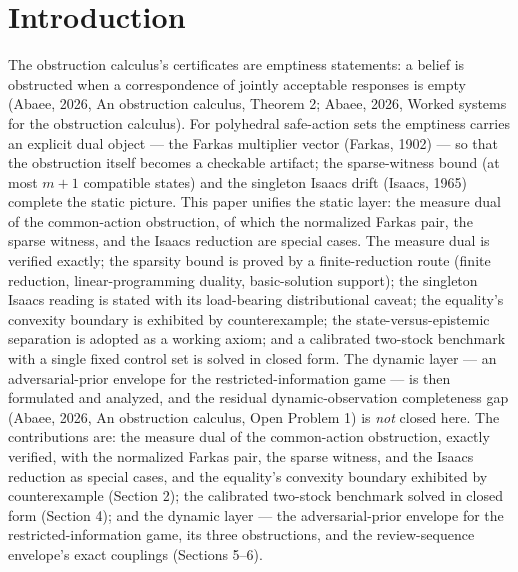 \documentclass[10pt,twocolumn]{article}
\theoremstyle{plain}
\theoremstyle{definition}
\theoremstyle{remark}
\begin{document}
\section{Introduction}

The obstruction calculus's certificates are emptiness statements: a belief is
obstructed when a correspondence of jointly acceptable responses is empty
(Abaee, 2026, An obstruction calculus, Theorem 2; Abaee, 2026, Worked systems for the obstruction calculus). For polyhedral safe-action sets the
emptiness carries an explicit dual object --- the Farkas multiplier vector (Farkas, 1902)
--- so that the obstruction itself becomes a checkable artifact; the
sparse-witness bound (at most $m+1$ compatible states) and the singleton
Isaacs drift (Isaacs, 1965) complete the static picture. This paper unifies the static layer: the measure dual of the common-action obstruction, of which the normalized Farkas pair, the sparse witness, and the Isaacs reduction are special cases. The measure dual is verified exactly; the sparsity bound is proved by a finite-reduction route (finite reduction, linear-programming duality, basic-solution support); the singleton Isaacs reading is stated with its load-bearing distributional caveat; the equality's convexity boundary is exhibited by counterexample; the state-versus-epistemic separation is adopted as a working axiom; and a calibrated two-stock benchmark with a single fixed control set is solved in closed form. The dynamic layer --- an adversarial-prior envelope for the restricted-information game --- is then formulated and analyzed, and the residual dynamic-observation completeness gap (Abaee, 2026, An obstruction calculus, Open Problem 1) is \emph{not} closed here. The contributions are: the measure dual of the common-action obstruction, exactly verified, with the normalized Farkas pair, the sparse witness, and the Isaacs reduction as special cases, and the equality's convexity boundary exhibited by counterexample (Section 2); the calibrated two-stock benchmark solved in closed form (Section 4); and the dynamic layer --- the adversarial-prior envelope for the restricted-information game, its three obstructions, and the review-sequence envelope's exact couplings (Sections 5--6).
\end{document}
